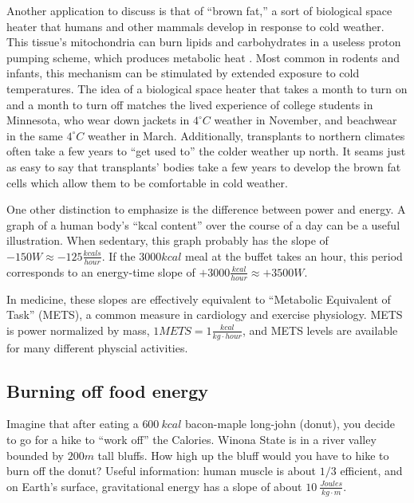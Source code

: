 \documentclass[12pt]{iopart}
\newcommand{\degC}{^{\circ}C}
\begin{document}
Another application to discuss is that of ``brown fat,'' a sort of biological space heater that humans and other mammals develop in response to cold weather.  This tissue's mitochondria can burn lipids and carbohydrates in a useless proton pumping scheme, which produces metabolic heat \cite{brown_fat}.  Most common in rodents and infants, this mechanism can be stimulated by extended exposure to cold temperatures.  The idea of a biological space heater that takes a month to turn on and a month to turn off matches the lived experience of college students in Minnesota, who wear down jackets in $4\degC$ weather in November, and beachwear in the same $4\degC$ weather in March.  Additionally, transplants to northern climates often take a few years to ``get used to'' the colder weather up north. It seams just as easy to say that transplants' bodies take a few years to develop the brown fat cells which allow them to be comfortable in cold weather.

One other distinction to emphasize is the difference between power and energy.  A graph of a human body's ``kcal content'' over the course of a day can be a useful illustration.  When sedentary, this graph probably has the slope of $-150W\approx -125 \frac{kcals}{hour}$.  If the $3000kcal$ meal at the buffet takes an hour, this period corresponds to an energy-time slope of $+3000\frac{kcal}{hour}\approx +3500W$.  

In medicine, these slopes are effectively equivalent to ``Metabolic Equivalent of Task'' (METS), a common measure in cardiology and exercise physiology.  METS is power normalized by mass, $1METS=1\frac{kcal}{kg\cdot hour}$, and METS levels are available for many different physcial activities. \cite{METS}

\subsection{Burning off food energy}
Imagine that after eating a $600~kcal$ bacon-maple long-john (donut), you decide to go for a hike to ``work off'' the Calories.  Winona State  is in a river valley bounded by $200m$ tall bluffs.  How high up the bluff would you have to hike to burn off the donut?  
Useful information: human muscle is about $1/3$ efficient, and on Earth's surface, gravitational energy has a slope of about $10~\frac{Joules}{kg\cdot m}$.
\end{document}
